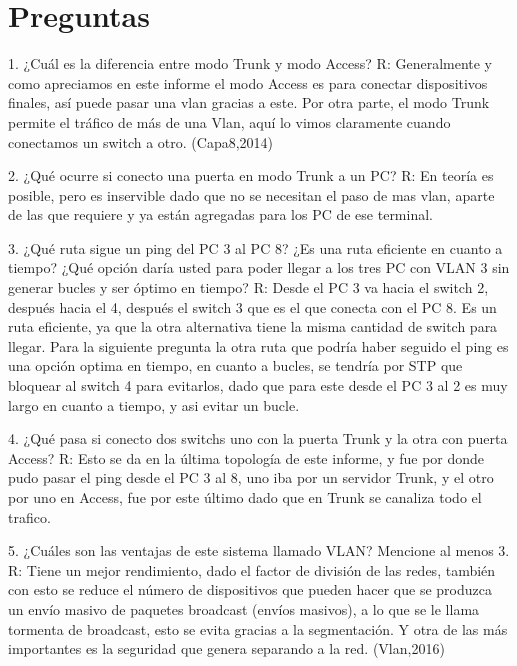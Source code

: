 \documentclass{article}
\begin{document}
\cleardoublepage

\section{Preguntas}

1.	¿Cuál es la diferencia entre modo Trunk y modo Access? 
R:  Generalmente y como apreciamos en este informe el modo Access es para conectar dispositivos finales, así puede pasar una vlan gracias a este. Por otra parte, el modo Trunk permite el tráfico de más de una Vlan, aquí lo vimos claramente cuando conectamos un switch a otro. (Capa8,2014)

2.	¿Qué ocurre si conecto una puerta en modo Trunk a un PC? 
R:  En teoría es posible, pero es inservible dado que no se necesitan el paso de mas vlan, aparte de las que requiere y ya están agregadas para los PC de ese terminal.

3.	¿Qué ruta sigue un ping del PC 3 al PC 8? ¿Es una ruta eficiente en cuanto a tiempo? ¿Qué opción daría usted para poder llegar a los tres PC con VLAN 3 sin generar bucles y ser óptimo en tiempo? 
R: Desde el PC 3 va hacia el switch 2, después hacia el 4, después el switch 3 que es el que conecta con el PC 8. Es un ruta eficiente, ya que la otra alternativa tiene la misma cantidad de switch para llegar. Para la siguiente pregunta la otra ruta que podría haber seguido el ping es una opción optima en tiempo, en cuanto a bucles, se tendría por STP que bloquear al switch 4 para evitarlos, dado que para este desde el PC 3 al 2 es muy largo en cuanto a tiempo, y asi evitar un bucle.

4.	¿Qué pasa si conecto dos switchs uno con la puerta Trunk y la otra con puerta Access? 
R: Esto se da en la última topología de este informe, y fue por donde pudo pasar el ping desde el PC 3 al 8, uno iba por un servidor Trunk, y el otro por uno en Access, fue por este último dado que en Trunk se canaliza todo el trafico.

5.	¿Cuáles son las ventajas de este sistema llamado VLAN? Mencione al menos 3.
R: Tiene un mejor rendimiento, dado el factor de división de las redes, también con esto se reduce el número de dispositivos que pueden hacer que se produzca un envío masivo de paquetes broadcast (envíos masivos), a lo que se le llama tormenta de broadcast, esto se evita gracias a la segmentación. Y otra de las más importantes es la seguridad que genera separando a la red. (Vlan,2016)

\newpage
\end{document}
